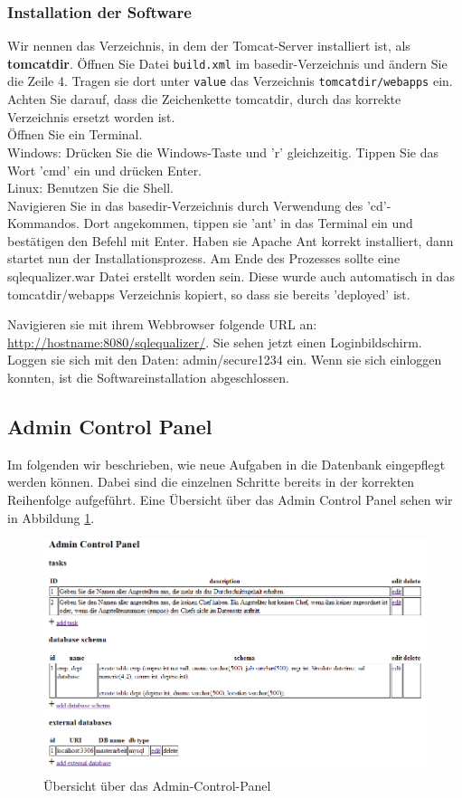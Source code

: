 \documentclass[12pt]{scrreprt}
\theoremstyle{remark}
\begin{document}
\subsubsection{Installation der Software}

Wir nennen das Verzeichnis, in dem der Tomcat-Server installiert ist, als \textbf{tomcatdir}.
Öffnen Sie Datei \verb|build.xml| im basedir-Verzeichnis und ändern Sie die Zeile 4. Tragen sie dort unter \verb|value| das Verzeichnis \verb|tomcatdir/webapps| ein. Achten Sie darauf, dass die Zeichenkette tomcatdir, durch das korrekte Verzeichnis ersetzt worden ist.\\

Öffnen Sie ein Terminal.\\
Windows: Drücken Sie die Windows-Taste und 'r' gleichzeitig. Tippen Sie das Wort 'cmd' ein und drücken Enter.\\
Linux: Benutzen Sie die Shell.\\

Navigieren Sie in das basedir-Verzeichnis durch Verwendung des 'cd'-Kommandos. Dort angekommen, tippen sie 'ant' in das Terminal ein und bestätigen den Befehl mit Enter. Haben sie Apache Ant korrekt installiert, dann startet nun der Installationsprozess. Am Ende des Prozesses sollte eine sqlequalizer.war Datei erstellt worden sein. Diese wurde auch automatisch in das tomcatdir/webapps Verzeichnis kopiert, so dass sie bereits 'deployed' ist. 

Navigieren sie mit ihrem Webbrowser folgende URL an: \url{http://hostname:8080/sqlequalizer/}. Sie sehen jetzt einen Loginbildschirm. Loggen sie sich mit den Daten: admin/secure1234 ein. Wenn sie sich einloggen konnten, ist die Softwareinstallation abgeschlossen.

\subsection{Admin Control Panel}

Im folgenden wir beschrieben, wie neue Aufgaben in die Datenbank eingepflegt werden können. Dabei sind die einzelnen Schritte bereits in der korrekten Reihenfolge aufgeführt. Eine Übersicht über das Admin Control Panel sehen wir in Abbildung \ref{fig:acp}.

\begin{figure}[H]
\centering
\includegraphics[scale=0.51]{Bilder/screen_acp_2.png}
\caption{Übersicht über das Admin-Control-Panel}
\label{fig:acp}
\end{figure}
\end{document}
